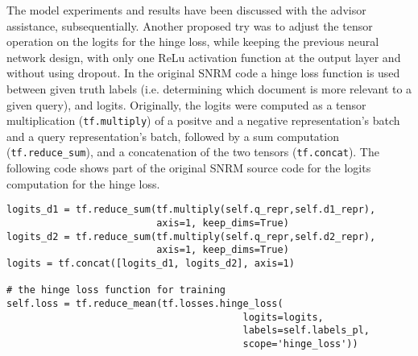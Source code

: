 The model experiments and results have been discussed with the advisor assistance, subsequentially.
Another proposed try was to adjust the tensor operation on the logits for the hinge loss,
    while keeping the previous neural network design, with only one ReLu activation function at the output layer and
    without using dropout.
In the original SNRM code a hinge loss function is used between given truth labels
    (i.e. determining which document is more relevant to a given query),
    and logits.
Originally, the logits were computed as a tensor multiplication (\texttt{tf.multiply}) of 
    a positve and a negative representation's batch and a query representation's batch,
    followed by a sum computation (\texttt{tf.reduce\_sum}), 
    and a concatenation of the two tensors (\texttt{tf.concat}).
The following code shows part of the original SNRM source code for the logits computation for the hinge loss.

\begin{verbatim}
logits_d1 = tf.reduce_sum(tf.multiply(self.q_repr,self.d1_repr),
                          axis=1, keep_dims=True)
logits_d2 = tf.reduce_sum(tf.multiply(self.q_repr,self.d2_repr),
                          axis=1, keep_dims=True)
logits = tf.concat([logits_d1, logits_d2], axis=1)

# the hinge loss function for training
self.loss = tf.reduce_mean(tf.losses.hinge_loss(
                                         logits=logits, 
                                         labels=self.labels_pl, 
                                         scope='hinge_loss'))
\end{verbatim}

